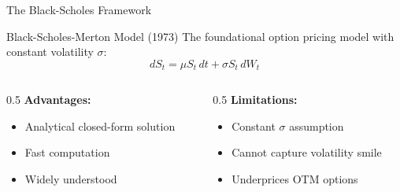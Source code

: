 \documentclass{beamer}
\begin{document}
\begin{frame}{The Black-Scholes Framework}
    \begin{block}{Black-Scholes-Merton Model (1973)}
        The foundational option pricing model with constant volatility $\sigma$:
        \begin{equation}
            dS_t = \mu S_t \, dt + \sigma S_t \, dW_t
        \end{equation}
    \end{block}

    \vspace{0.3cm}

    \begin{columns}
        \begin{column}{0.5\textwidth}
            \textbf{Advantages:}
            \begin{itemize}
                \item Analytical closed-form solution
                \item Fast computation
                \item Widely understood
            \end{itemize}
        \end{column}
        \begin{column}{0.5\textwidth}
            \textbf{Limitations:}
            \begin{itemize}
                \item Constant $\sigma$ assumption
                \item Cannot capture volatility smile
                \item Underprices OTM options
            \end{itemize}
        \end{column}
    \end{columns}
\end{frame}
\end{document}
